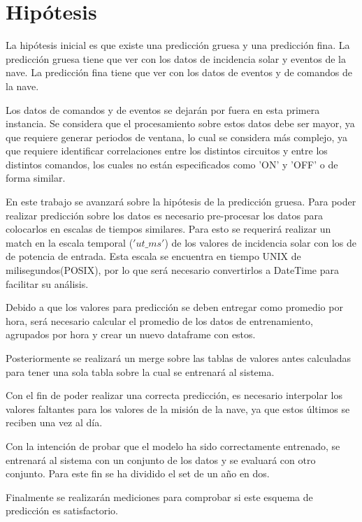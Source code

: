 \documentclass[../Main.tex]{subfiles}
\begin{document}
\section{Hipótesis}
La hipótesis inicial es que existe una predicción gruesa y una predicción fina. La predicción gruesa tiene que ver con los datos de incidencia solar y eventos de la nave. La predicción fina tiene que ver con los datos de eventos y de comandos de la nave.
\newline \par
Los datos de comandos y de eventos se dejarán por fuera en esta primera instancia. Se considera que el procesamiento sobre estos datos debe ser mayor, ya que requiere generar periodos de ventana, lo cual se considera más complejo, ya que requiere identificar correlaciones entre los distintos circuitos y entre los distintos comandos, los cuales no están especificados como 'ON' y 'OFF' o de forma similar.
\newline \par
En este trabajo se avanzará sobre la hipótesis de la predicción gruesa. Para poder realizar predicción sobre los datos es necesario pre-procesar los datos para colocarlos en escalas de tiempos similares. Para esto se requerirá realizar un match en la escala temporal ($'ut\_ms'$) de los valores de incidencia solar con los de de potencia de entrada. Esta escala se encuentra en tiempo UNIX de milisegundos(POSIX), por lo que será necesario convertirlos a DateTime para facilitar su análisis.
\newline \par
Debido a que los valores para predicción se deben entregar como promedio por hora, será necesario calcular el promedio de los datos de entrenamiento, agrupados por hora y crear un nuevo dataframe con estos.
\newline \par
Posteriormente se realizará un merge sobre las tablas de valores antes calculadas para tener una sola tabla sobre la cual se entrenará al sistema. 
\newline \par
Con el fin de poder realizar una correcta predicción, es necesario interpolar los valores faltantes para los valores de la misión de la nave, ya que estos últimos se reciben una vez al día.
\newline \par
Con la intención de probar que el modelo ha sido correctamente entrenado, se entrenará al sistema con un conjunto de los datos y se evaluará con otro conjunto. Para este fin se ha dividido el set de un año en dos.
\newline \par
Finalmente se realizarán mediciones para comprobar si este esquema de predicción es satisfactorio.
\end{document}
